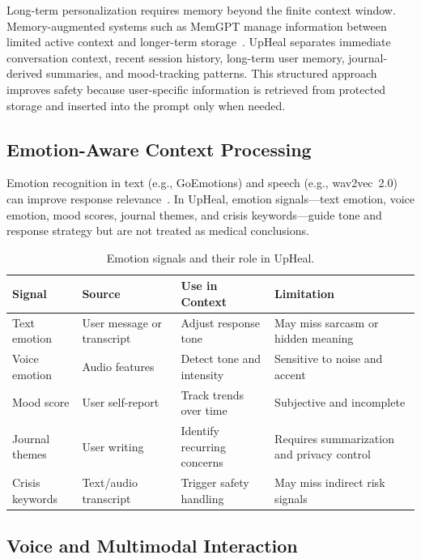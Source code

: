 \documentclass[12pt,a4paper,oneside,openany]{report}
\begin{document}
Long-term personalization requires memory beyond the finite context window. Memory-augmented systems such as MemGPT manage information between limited active context and longer-term storage~\cite{packer2023memgpt}. UpHeal separates immediate conversation context, recent session history, long-term user memory, journal-derived summaries, and mood-tracking patterns. This structured approach improves safety because user-specific information is retrieved from protected storage and inserted into the prompt only when needed.

\subsection{Emotion-Aware Context Processing}

Emotion recognition in text (e.g., GoEmotions) and speech (e.g., wav2vec~2.0) can improve response relevance~\cite{demszky2019goemotions,baevski2020wav2vec}. In UpHeal, emotion signals---text emotion, voice emotion, mood scores, journal themes, and crisis keywords---guide tone and response strategy but are not treated as medical conclusions.

\begin{table}[H]
\centering\small
\caption{Emotion signals and their role in UpHeal.}
\label{tab:emotionsignals}
\begin{tabular}{@{}llll@{}}
\toprule
Signal & Source & Use in Context & Limitation \\
\midrule
Text emotion & User message or transcript & Adjust response tone & May miss sarcasm or hidden meaning \\
Voice emotion & Audio features & Detect tone and intensity & Sensitive to noise and accent \\
Mood score & User self-report & Track trends over time & Subjective and incomplete \\
Journal themes & User writing & Identify recurring concerns & Requires summarization and privacy control \\
Crisis keywords & Text/audio transcript & Trigger safety handling & May miss indirect risk signals \\
\bottomrule
\end{tabular}
\end{table}

\subsection{Voice and Multimodal Interaction}
\end{document}
